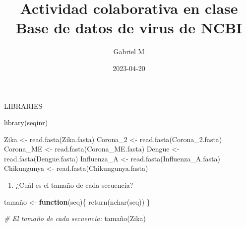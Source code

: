\documentclass[
]{article}
\title{Actividad colaborativa en clase \textbar{} Base de datos de virus
de NCBI}
\author{Gabriel M}
\date{2023-04-20}
\newenvironment{Shaded}{\begin{snugshade}}{\end{snugshade}}
\newcommand{\CommentTok}[1]{\textcolor[rgb]{0.56,0.35,0.01}{\textit{#1}}}
\newcommand{\ControlFlowTok}[1]{\textcolor[rgb]{0.13,0.29,0.53}{\textbf{#1}}}
\newcommand{\FunctionTok}[1]{\textcolor[rgb]{0.00,0.00,0.00}{#1}}
\newcommand{\NormalTok}[1]{#1}
\newcommand{\OtherTok}[1]{\textcolor[rgb]{0.56,0.35,0.01}{#1}}
\newcommand{\StringTok}[1]{\textcolor[rgb]{0.31,0.60,0.02}{#1}}
\providecommand{\tightlist}{%
  \setlength{\itemsep}{0pt}\setlength{\parskip}{0pt}}
\begin{document}
\maketitle

LIBRARIES

\begin{Shaded}
\begin{Highlighting}[]
\FunctionTok{library}\NormalTok{(}\StringTok{\textquotesingle{}seqinr\textquotesingle{}}\NormalTok{)}
\end{Highlighting}
\end{Shaded}

\begin{Shaded}
\begin{Highlighting}[]
\NormalTok{Zika }\OtherTok{\textless{}{-}} \FunctionTok{read.fasta}\NormalTok{(}\StringTok{\textquotesingle{}Zika.fasta\textquotesingle{}}\NormalTok{)}
\NormalTok{Corona\_2 }\OtherTok{\textless{}{-}} \FunctionTok{read.fasta}\NormalTok{(}\StringTok{\textquotesingle{}Corona\_2.fasta\textquotesingle{}}\NormalTok{)}
\NormalTok{Corona\_ME }\OtherTok{\textless{}{-}} \FunctionTok{read.fasta}\NormalTok{(}\StringTok{\textquotesingle{}Corona\_ME.fasta\textquotesingle{}}\NormalTok{)}
\NormalTok{Dengue }\OtherTok{\textless{}{-}} \FunctionTok{read.fasta}\NormalTok{(}\StringTok{\textquotesingle{}Dengue.fasta\textquotesingle{}}\NormalTok{)}
\NormalTok{Influenza\_A }\OtherTok{\textless{}{-}} \FunctionTok{read.fasta}\NormalTok{(}\StringTok{\textquotesingle{}Influenza\_A.fasta\textquotesingle{}}\NormalTok{)}
\NormalTok{Chikungunya }\OtherTok{\textless{}{-}} \FunctionTok{read.fasta}\NormalTok{(}\StringTok{\textquotesingle{}Chikungunya.fasta\textquotesingle{}}\NormalTok{)}
\end{Highlighting}
\end{Shaded}

\begin{enumerate}
\def\labelenumi{\arabic{enumi}.}
\tightlist
\item
  ¿Cuál es el tamaño de cada secuencia?
\end{enumerate}

\begin{Shaded}
\begin{Highlighting}[]
\NormalTok{tamaño }\OtherTok{\textless{}{-}} \ControlFlowTok{function}\NormalTok{(seq)\{}
  \FunctionTok{return}\NormalTok{(}\FunctionTok{nchar}\NormalTok{(seq))}
\NormalTok{\}}

\CommentTok{\# El tamaño de cada secuencia:}
\NormalTok{tamaño(Zika)}
\end{Highlighting}
\end{Shaded}
\end{document}
